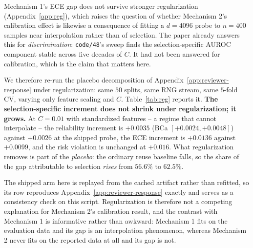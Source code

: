\documentclass{article}
\begin{document}
Mechanism 1's ECE gap does not survive stronger regularization
(Appendix~\ref{app:reg}), which raises the question of whether Mechanism 2's
calibration effect is likewise a consequence of fitting a $d{=}4096$ probe to
$n{=}400$ samples near interpolation rather than of selection. The paper
already answers this for \emph{discrimination}: \texttt{code/48}'s sweep finds
the selection-specific AUROC component stable across five decades of $C$. It
had not been answered for calibration, which is the claim that matters here.

We therefore re-run the placebo decomposition of
Appendix~\ref{app:reviewer-response} under regularization: same $50$ splits,
same RNG stream, same $5$-fold CV, varying only feature scaling and $C$.
Table~\ref{tab:reg} reports it. \textbf{The selection-specific increment does
not shrink under regularization; it grows.} At $C{=}0.01$ with standardized
features -- a regime that cannot interpolate -- the reliability increment is
$+0.0035$ (BCa $[+0.0024,+0.0048]$) against $+0.0026$ at the shipped probe, the
ECE increment is $+0.0136$ against $+0.0099$, and the risk violation is
unchanged at $+0.016$. What regularization removes is part of the
\emph{placebo}: the ordinary reuse baseline falls, so the share of the gap
attributable to selection \emph{rises} from $56.6\%$ to $62.5\%$.

The shipped arm here is replayed from the cached artifact rather than refitted,
so its row reproduces Appendix~\ref{app:reviewer-response} exactly and serves
as a consistency check on this script. Regularization is therefore not a
competing explanation for Mechanism 2's calibration result, and the contrast
with Mechanism 1 is informative rather than awkward: Mechanism 1 fits on the
evaluation data and its gap is an interpolation phenomenon, whereas Mechanism 2
never fits on the reported data at all and its gap is not.
\end{document}
